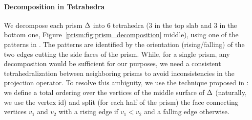  \paragraph{Decomposition in Tetrahedra} We decompose each prism $\Delta$ into 6 tetrahedra (3 in the top slab and 3 in the bottom one, Figure~\ref{prism:fig:prism_decomposition} middle), using one of the patterns in \cite[Figure 4]{dompierre1999subdivide}. The patterns are identified by the orientation (rising/falling) of the two edges cutting the side faces of the prism. While, for a single prism, any decomposition would be sufficient for our purposes, we need a consistent tetrahedralization between neighboring prisms to avoid inconsistencies in the projection operator. To resolve this ambiguity, we use the technique proposed in \cite{garimella2000boundary}: we define a total ordering over the vertices of the middle surface of $\Delta$ (naturally, we use the vertex id) and split (for each half of the prism) the face connecting vertices $v_1$ and $v_2$ with a rising edge if $v_1 < v_2$ and a falling edge otherwise. 

